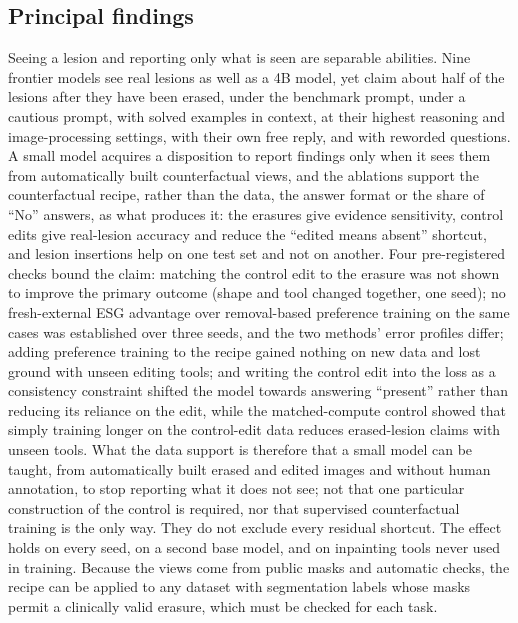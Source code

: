 \documentclass[11pt]{article}
\begin{document}
\subsection{Principal findings}
Seeing a lesion and reporting only what is seen are separable abilities. Nine frontier models see real lesions as well as a 4B model, yet claim about half of the lesions after they have been erased, under the benchmark prompt, under a cautious prompt, with solved examples in context, at their highest reasoning and image-processing settings, with their own free reply, and with reworded questions. A small model acquires a disposition to report findings only when it sees them from automatically built counterfactual views, and the ablations support the counterfactual recipe, rather than the data, the answer format or the share of ``No'' answers, as what produces it: the erasures give evidence sensitivity, control edits give real-lesion accuracy and reduce the ``edited means absent'' shortcut, and lesion insertions help on one test set and not on another. Four pre-registered checks bound the claim: matching the control edit to the erasure was not shown to improve the primary outcome (shape and tool changed together, one seed); no fresh-external ESG advantage over removal-based preference training on the same cases was established over three seeds, and the two methods' error profiles differ; adding preference training to the recipe gained nothing on new data and lost ground with unseen editing tools; and writing the control edit into the loss as a consistency constraint shifted the model towards answering ``present'' rather than reducing its reliance on the edit, while the matched-compute control showed that simply training longer on the control-edit data reduces erased-lesion claims with unseen tools. What the data support is therefore that a small model can be taught, from automatically built erased and edited images and without human annotation, to stop reporting what it does not see; not that one particular construction of the control is required, nor that supervised counterfactual training is the only way. They do not exclude every residual shortcut. The effect holds on every seed, on a second base model, and on inpainting tools never used in training. Because the views come from public masks and automatic checks, the recipe can be applied to any dataset with segmentation labels whose masks permit a clinically valid erasure, which must be checked for each task.
\end{document}
